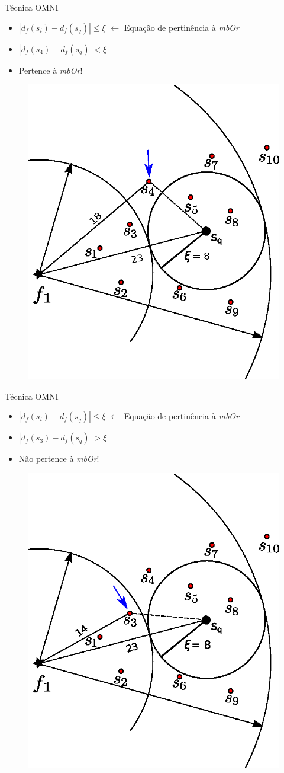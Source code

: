 \documentclass{beamer}
\begin{document}
\begin{frame}{Técnica OMNI}
	\begin{itemize}
	 \item $|d_f(s_i) - d_f(s_q)| \leq \xi$ $\leftarrow$ Equação de pertinência à \textit{mbOr}\newline
	 \item $|d_f(s_4) - d_f(s_q)| < \xi$\newline
	 \item Pertence à \textit{mbOr}!
	\end{itemize}

	\begin{figure}[H]
			\centering
			\includegraphics[width=.35\textwidth]{dados/figuras/rg_ex4.eps}
	\end{figure} 

\end{frame}

\begin{frame}{Técnica OMNI}
	\begin{itemize}
	 \item $|d_f(s_i) - d_f(s_q)| \leq \xi$ $\leftarrow$ Equação de pertinência à \textit{mbOr}\newline
	 \item $|d_f(s_3) - d_f(s_q)| > \xi$\newline
	 \item Não pertence à \textit{mbOr}!
	\end{itemize}

	\begin{figure}[H]
			\centering
			\includegraphics[width=.35\textwidth]{rg_ex2.eps}
	\end{figure}

\end{frame}
\end{document}
